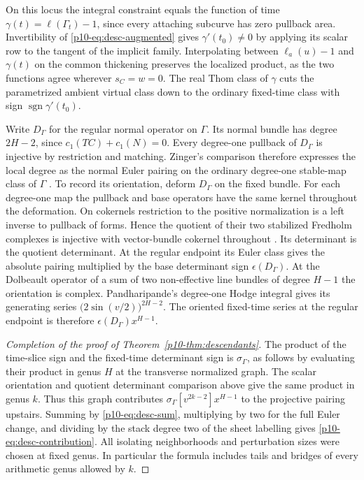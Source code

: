 On this locus the integral constraint equals the function of time
$\gamma(t)=\ell(\Gamma_t)-1$, since every attaching subcurve has
zero pullback area. Invertibility of \eqref{p10-eq:desc-augmented} gives
$\gamma'(t_0)\ne0$ by applying its scalar row to the tangent of
the implicit family. Interpolating between $\ell_a(u)-1$ and
$\gamma(t)$ on the common thickening preserves the localized product,
as the two functions agree wherever $s_C=w=0$. The real Thom class
of $\gamma$ cuts the parametrized ambient virtual class down to the
ordinary fixed-time class with sign $\operatorname{sgn}\gamma'(t_0)$.

Write $D_\Gamma$ for the regular normal operator on $\Gamma$.
Its normal bundle has degree $2H-2$, since
$c_1(TC)+c_1(N)=0$. Every degree-one pullback of $D_\Gamma$ is
injective by restriction and matching. Zinger's comparison therefore
expresses the local degree as the normal Euler pairing on the ordinary
degree-one stable-map class of $\Gamma$ \cite[Theorem~1.2]{zinger}.
To record its orientation, deform $D_\Gamma$ on the fixed bundle.
For each degree-one map the pullback and base operators have the same
kernel throughout the deformation. On cokernels restriction to the
positive normalization is a left inverse to pullback of forms.
Hence the quotient of their two stabilized Fredholm complexes is
injective with vector-bundle cokernel throughout
\cite[Appendix~B]{bai}. Its determinant is the quotient determinant.
At the regular endpoint its Euler class gives the absolute pairing
multiplied by the base determinant sign $\epsilon(D_\Gamma)$.
At the Dolbeault operator of a sum of two non-effective line bundles
of degree $H-1$ the orientation is complex. Pandharipande's
degree-one Hodge integral \cite[Theorem~2]{pandhodge} gives its
generating series $\bigl(2\sin(v/2)\bigr)^{2H-2}$. The oriented
fixed-time series at the regular endpoint is therefore
$\epsilon(D_\Gamma)x^{H-1}$.

\begin{proof}[Completion of the proof of Theorem~\ref{p10-thm:descendants}]
The product of the time-slice sign and the fixed-time determinant
sign is $\sigma_\Gamma$, as follows by evaluating their product in
genus $H$ at the transverse normalized graph. The scalar orientation
and quotient determinant comparison above give the same product in
genus $k$. Thus this graph contributes
$\sigma_\Gamma[v^{2k-2}]x^{H-1}$ to the projective pairing upstairs.
Summing by \eqref{p10-eq:desc-sum}, multiplying by two for the full
Euler change, and dividing by the stack degree two of the sheet
labelling gives \eqref{p10-eq:desc-contribution}. All isolating
neighborhoods and perturbation sizes were chosen at fixed genus.
In particular the formula includes tails and bridges of every
arithmetic genus allowed by $k$.
\end{proof}
